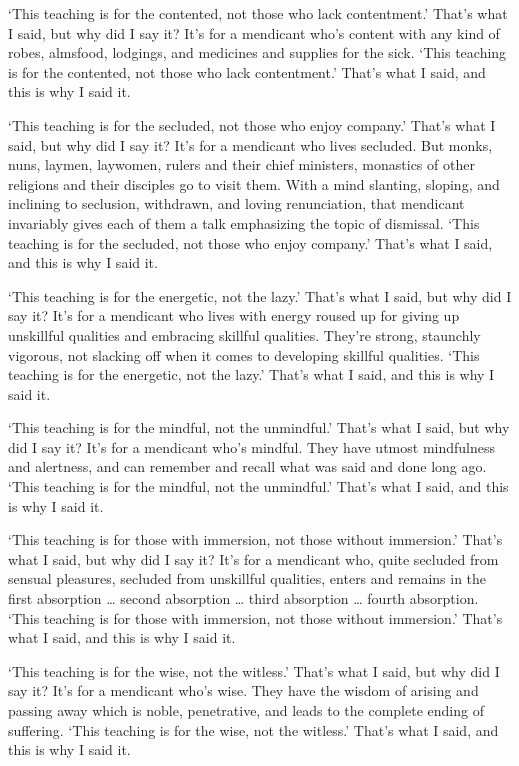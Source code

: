 \documentclass[12pt,openany]{book}%
\begin{document}
‘This teaching is for the contented, not those who lack contentment.’ That’s what I said, but why did I say it? It’s for a mendicant who’s content with any kind of robes, almsfood, lodgings, and medicines and supplies for the sick. ‘This teaching is for the contented, not those who lack contentment.’ That’s what I said, and this is why I said it. 

‘This teaching is for the secluded, not those who enjoy company.’ That’s what I said, but why did I say it? It’s for a mendicant who lives secluded. But monks, nuns, laymen, laywomen, rulers and their chief ministers, monastics of other religions and their disciples go to visit them. With a mind slanting, sloping, and inclining to seclusion, withdrawn, and loving renunciation, that mendicant invariably gives each of them a talk emphasizing the topic of dismissal. ‘This teaching is for the secluded, not those who enjoy company.’ That’s what I said, and this is why I said it. 

‘This teaching is for the energetic, not the lazy.’ That’s what I said, but why did I say it? It’s for a mendicant who lives with energy roused up for giving up unskillful qualities and embracing skillful qualities. They’re strong, staunchly vigorous, not slacking off when it comes to developing skillful qualities. ‘This teaching is for the energetic, not the lazy.’ That’s what I said, and this is why I said it. 

‘This teaching is for the mindful, not the unmindful.’ That’s what I said, but why did I say it? It’s for a mendicant who’s mindful. They have utmost mindfulness and alertness, and can remember and recall what was said and done long ago. ‘This teaching is for the mindful, not the unmindful.’ That’s what I said, and this is why I said it. 

‘This teaching is for those with immersion, not those without immersion.’ That’s what I said, but why did I say it? It’s for a mendicant who, quite secluded from sensual pleasures, secluded from unskillful qualities, enters and remains in the first absorption … second absorption … third absorption … fourth absorption. ‘This teaching is for those with immersion, not those without immersion.’ That’s what I said, and this is why I said it. 

‘This teaching is for the wise, not the witless.’ That’s what I said, but why did I say it? It’s for a mendicant who’s wise. They have the wisdom of arising and passing away which is noble, penetrative, and leads to the complete ending of suffering. ‘This teaching is for the wise, not the witless.’ That’s what I said, and this is why I said it. 
\end{document}

